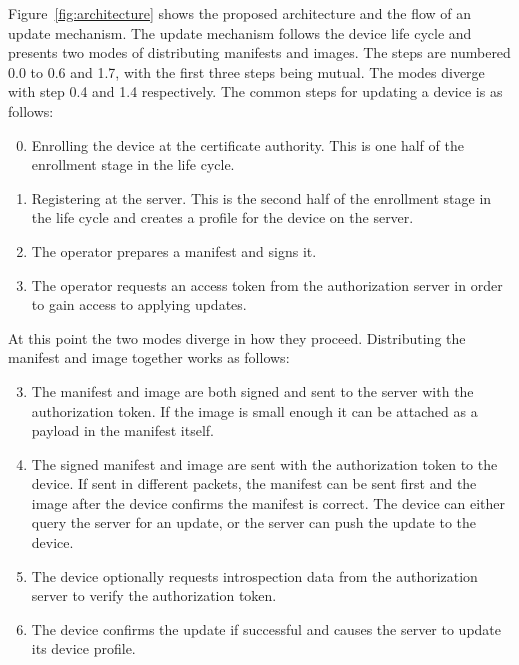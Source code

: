\documentclass[0-thesis.tex]{subfiles}
\begin{document}
Figure~\ref{fig:architecture} shows the proposed architecture and the flow of an update
mechanism. The update mechanism follows the device life cycle and presents two modes of
distributing manifests and images. The steps are numbered 0.0 to 0.6 and 1.7, with the
first three steps being mutual. The modes diverge with step 0.4 and 1.4 respectively. The
common steps for updating a device is as follows:

\begin{enumerate}[label=0.\arabic*]
    \setcounter{enumi}{-1}
    \item Enrolling the device at the certificate authority. This is one half of the
            enrollment stage in the life cycle.
    \item Registering at the server. This is the second half of the enrollment stage
            in the life cycle and creates a profile for the device on the server.
    \item The operator prepares a manifest and signs it.
    \item The operator requests an access token from the authorization server in order to
            gain access to applying updates.
\end{enumerate}

At this point the two modes diverge in how they proceed. Distributing the manifest and
image together works as follows:

\begin{enumerate}[label=0.\arabic*]
    \setcounter{enumi}{2}
    \item The manifest and image are both signed and sent to the server with the
            authorization token. If the image is small enough it can be attached as a
            payload in the manifest itself.
    \item The signed manifest and image are sent with the authorization token to the
            device. If sent in different packets, the manifest can be sent first and the
            image after the device confirms the manifest is correct. The device can either
            query the server for an update, or the server can push the update to the
            device.
    \item The device optionally requests introspection data from the authorization server
            to verify the authorization token.
    \item The device confirms the update if successful and causes the server to update
            its device profile.
\end{enumerate}
\end{document}
